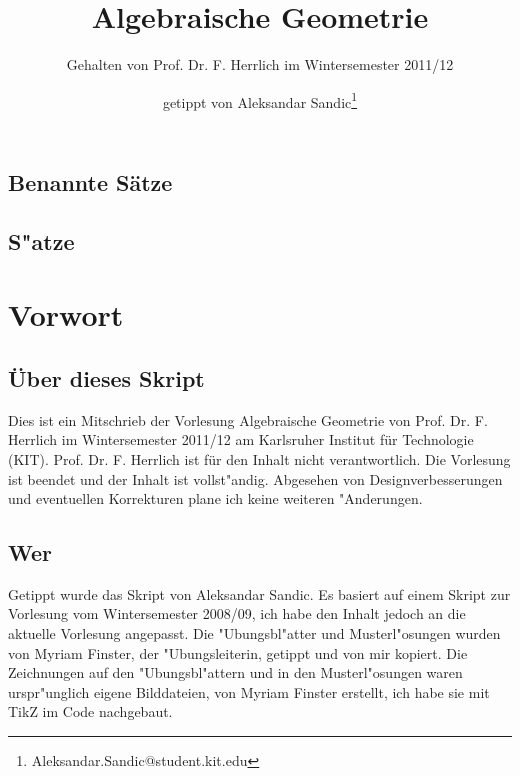 \documentclass[a4paper, 12pt, numbers=noendperiod, chapterprefix=true, headsepline]{scrbook}
\title{Algebraische Geometrie}
\subtitle{Gehalten von Prof. Dr. F. Herrlich im Wintersemester 2011/12}
\author{getippt von Aleksandar Sandic\thanks{Aleksandar.Sandic@student.kit.edu}}
\theoremstyle{break}
\theoremstyle{nonumberbreak}
\theoremstyle{nonumberplain}
\newcommand{\quot}[1]{\textrm{\glqq}{#1}\textrm{\grqq}}
\begin{document}
\maketitle

\setlength\parskip{0.6pt}
\tableofcontents

\section*{Benannte S\"atze}


\section*{S"atze}


\setlength\parskip{\smallskipamount}



\chapter{Vorwort}
\setcounter{secnumdepth}{2}
\section*{\"Uber dieses Skript}
Dies ist ein Mitschrieb der Vorlesung \quot{Algebraische Geometrie} von Prof. Dr. F. Herrlich im Wintersemester 2011/12 am Karlsruher Institut f\"ur Technologie (KIT). Prof. Dr. F. Herrlich ist f\"ur  den Inhalt nicht verantwortlich. Die Vorlesung ist beendet und der Inhalt ist vollst"andig. Abgesehen von Designverbesserungen und eventuellen Korrekturen plane ich keine weiteren "Anderungen.

\section*{Wer}
Getippt wurde das Skript von Aleksandar Sandic. Es basiert auf einem Skript zur Vorlesung vom Wintersemester 2008/09, ich habe den Inhalt jedoch an die aktuelle Vorlesung angepasst. Die "Ubungsbl"atter und Musterl"osungen wurden von Myriam Finster, der "Ubungsleiterin, getippt und von mir kopiert. Die Zeichnungen auf den "Ubungsbl"attern und in den Musterl"osungen waren urspr"unglich eigene Bilddateien, von Myriam Finster erstellt, ich habe sie mit TikZ im Code nachgebaut.
\end{document}
